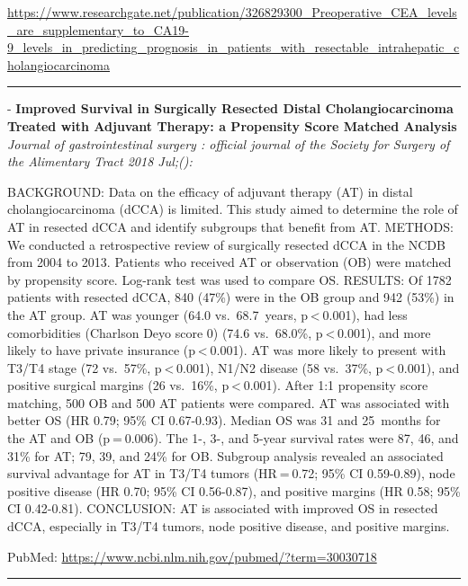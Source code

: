\documentclass[]{article}
\begin{document}
\url{https://www.researchgate.net/publication/326829300_Preoperative_CEA_levels_are_supplementary_to_CA19-9_levels_in_predicting_prognosis_in_patients_with_resectable_intrahepatic_cholangiocarcinoma}

\begin{center}\rule{0.5\linewidth}{\linethickness}\end{center}

 - \textbf{Improved Survival in Surgically Resected Distal
Cholangiocarcinoma Treated with Adjuvant Therapy: a Propensity Score
Matched Analysis} \emph{Journal of gastrointestinal surgery : official
journal of the Society for Surgery of the Alimentary Tract 2018 Jul;():}

BACKGROUND: Data on the efficacy of adjuvant therapy (AT) in distal
cholangiocarcinoma (dCCA) is limited. This study aimed to determine the
role of AT in resected dCCA and identify subgroups that benefit from AT.
METHODS: We conducted a retrospective review of surgically resected dCCA
in the NCDB from 2004 to 2013. Patients who received AT or observation
(OB) were matched by propensity score. Log-rank test was used to compare
OS. RESULTS: Of 1782 patients with resected dCCA, 840 (47\%) were in the
OB group and 942 (53\%) in the AT group. AT was younger (64.0
vs.~68.7~years, p \textless{} 0.001), had less comorbidities (Charlson
Deyo score 0) (74.6 vs.~68.0\%, p \textless{} 0.001), and more likely to
have private insurance (p \textless{} 0.001). AT was more likely to
present with T3/T4 stage (72 vs.~57\%, p \textless{} 0.001), N1/N2
disease (58 vs.~37\%, p \textless{} 0.001), and positive surgical
margins (26 vs.~16\%, p \textless{} 0.001). After 1:1 propensity score
matching, 500 OB and 500 AT patients were compared. AT was associated
with better OS (HR 0.79; 95\% CI 0.67-0.93). Median OS was 31 and
25~months for the AT and OB (p = 0.006). The 1-, 3-, and 5-year survival
rates were 87, 46, and 31\% for AT; 79, 39, and 24\% for OB. Subgroup
analysis revealed an associated survival advantage for AT in T3/T4
tumors (HR = 0.72; 95\% CI 0.59-0.89), node positive disease (HR 0.70;
95\% CI 0.56-0.87), and positive margins (HR 0.58; 95\% CI 0.42-0.81).
CONCLUSION: AT is associated with improved OS in resected dCCA,
especially in T3/T4 tumors, node positive disease, and positive margins.

PubMed: \url{https://www.ncbi.nlm.nih.gov/pubmed/?term=30030718}

{}

{}

\begin{center}\rule{0.5\linewidth}{\linethickness}\end{center}
\end{document}
